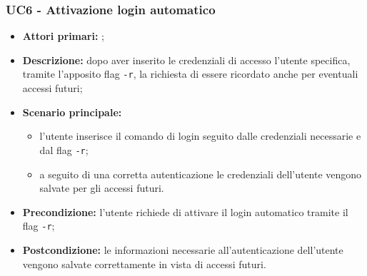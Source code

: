 \subsubsection{UC6 - Attivazione login automatico}
\begin{itemize}
	\item \textbf{Attori primari:} \una{};
	\item \textbf{Descrizione:} dopo aver inserito le credenziali di accesso l’utente specifica, tramite l’apposito flag \texttt{-r}, la richiesta di essere ricordato anche per eventuali accessi futuri;
	\item \textbf{Scenario principale:} 
	\begin{itemize}
		\item l’utente inserisce il comando di login seguito dalle credenziali necessarie e dal flag \texttt{-r};
		\item a seguito di una corretta autenticazione le credenziali dell’utente vengono salvate per gli accessi futuri.
	\end{itemize}
	\item \textbf{Precondizione:} l’utente richiede di attivare il login automatico tramite il flag \texttt{-r};
	\item \textbf{Postcondizione:} le informazioni necessarie all’autenticazione dell’utente vengono salvate correttamente in vista di accessi futuri.
\end{itemize}